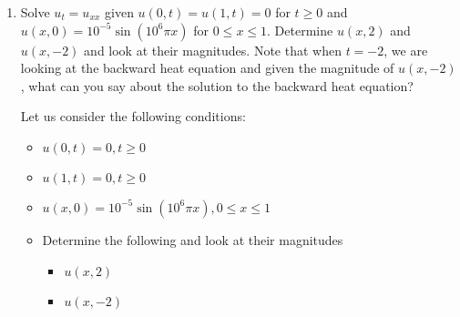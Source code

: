 \documentclass{article}
\begin{document}
\begin{enumerate}
%
%
  \item Solve $u_t = u_{xx}$ given $u(0, t) = u(1, t) = 0$ for $t \geq 0$ and $u(x, 0) = 10^{-5} \sin(10^6 \pi x)$ for $0 \leq x \leq 1$. Determine $u(x, 2)$ and $u(x, -2)$ and look at their magnitudes. Note that when $t = -2$, we are looking at the backward heat equation and given the magnitude of $u(x, -2)$, what can you say about the solution to the backward heat equation?

  Let us consider the following conditions:
  \begin{itemize}
    \item $u(0, t) = 0, t \geq 0$
    \item $u(1, t) = 0, t \geq 0$
    \item $u(x, 0) = 10^{-5} \sin(10^6 \pi x), 0 \leq x \leq 1$
    \item Determine the following and look at their magnitudes
    \begin{itemize}
      \item $u(x, 2)$
      \item $u(x, -2)$
    \end{itemize}
  \end{itemize}
\end{enumerate}
\end{document}
